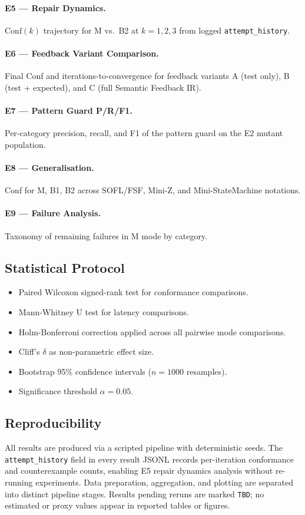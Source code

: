 \paragraph{E5 — Repair Dynamics.}
$\mathrm{Conf}(k)$ trajectory for M vs.\ B2 at $k=1,2,3$ from logged
\texttt{attempt\_history}.

\paragraph{E6 — Feedback Variant Comparison.}
Final Conf and iterations-to-convergence for feedback variants A (test only),
B (test + expected), and C (full Semantic Feedback IR).

\paragraph{E7 — Pattern Guard P/R/F1.}
Per-category precision, recall, and F1 of the pattern guard on the E2 mutant population.

\paragraph{E8 — Generalisation.}
Conf for M, B1, B2 across SOFL/FSF, Mini-Z, and Mini-StateMachine notations.

\paragraph{E9 — Failure Analysis.}
Taxonomy of remaining failures in M mode by category.

\subsection{Statistical Protocol}

\begin{itemize}
  \item Paired Wilcoxon signed-rank test for conformance comparisons.
  \item Mann-Whitney U test for latency comparisons.
  \item Holm-Bonferroni correction applied across all pairwise mode comparisons.
  \item Cliff's $\delta$ as non-parametric effect size.
  \item Bootstrap 95\% confidence intervals ($n=1000$ resamples).
  \item Significance threshold $\alpha = 0.05$.
\end{itemize}

\subsection{Reproducibility}

All results are produced via a scripted pipeline with deterministic seeds.
The \texttt{attempt\_history} field in every result JSONL records per-iteration
conformance and counterexample counts, enabling E5 repair dynamics analysis without
re-running experiments.
Data preparation, aggregation, and plotting are separated into distinct pipeline stages.
Results pending reruns are marked \texttt{TBD}; no estimated or proxy values appear
in reported tables or figures.
